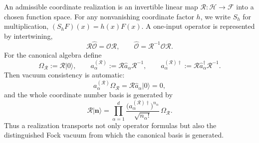 \documentclass[11pt,oneside]{article}
\numberwithin{equation}{section}
\theoremstyle{definition}
\begin{document}
An admissible coordinate realization is an invertible linear map $\mathcal R:\mathscr H\to\mathscr F$ into a chosen function space.  For any nonvanishing coordinate factor $h$, we write $S_h$ for multiplication, $(S_hF)(x)=h(x)F(x)$.  A one-input operator is represented by intertwining,
\begin{equation}
\mathcal R\widehat{\mathcal O}=\mathcal O\mathcal R,
\qquad
\widehat{\mathcal O}=\mathcal R^{-1}\mathcal O\mathcal R.
\label{eq:maxwell_linear_intertwining_intro}
\end{equation}
For the canonical algebra define
\begin{equation}
\Omega_{\mathcal R}:=\mathcal R|0\rangle,
\qquad
a^{(\mathcal R)}_\alpha:=\mathcal R\hat a_\alpha\mathcal R^{-1},
\qquad
a^{(\mathcal R)\dagger}_\alpha:=\mathcal R\hat a_\alpha^\dagger\mathcal R^{-1}.
\label{eq:maxwell_realization_vacuum_generators}
\end{equation}
Then vacuum consistency is automatic:
\begin{equation}
a^{(\mathcal R)}_\alpha\Omega_{\mathcal R}
=\mathcal R\hat a_\alpha|0\rangle=0,
\label{eq:maxwell_realization_vacuum_consistency}
\end{equation}
and the whole coordinate number basis is generated by
\begin{equation}
\mathcal R|\bm n\rangle
=
\prod_{\alpha=1}^{d}
\frac{\bigl(a^{(\mathcal R)\dagger}_\alpha\bigr)^{n_\alpha}}{\sqrt{n_\alpha!}}\,\Omega_{\mathcal R}.
\label{eq:maxwell_realization_basis_from_vacuum}
\end{equation}
Thus a realization transports not only operator formulas but also the distinguished Fock vacuum from which the canonical basis is generated.
\end{document}

